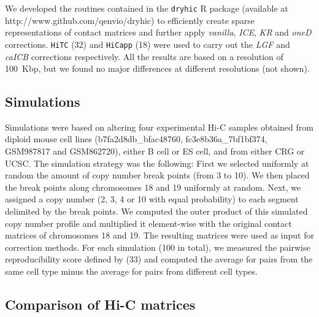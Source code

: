 \documentclass[a4,center,fleqn]{NAR}
\providecommand{\DIFadd}[1]{{\protect\color{red}#1}} %
\providecommand{\DIFdel}[1]{{\protect}}                      %
\providecommand{\DIFaddbegin}{} %
\providecommand{\DIFaddend}{} %
\providecommand{\DIFdelbegin}{} %
\providecommand{\DIFdelend}{} %
\begin{document}
We developed the routines contained in the \texttt{dryhic} R package
(available at http://www.github.com/qenvio/dryhic) to efficiently create
sparse representations of contact matrices and further apply
\textit{vanilla}, \textit{ICE}\DIFaddbegin \DIFadd{, }\textit{\DIFadd{KR}} \DIFaddend and \textit{oneD} corrections.
\texttt{HiTC} (\DIFdelbegin \DIFdel{33}\DIFdelend \DIFaddbegin \DIFadd{32}\DIFaddend ) and \texttt{HiCapp}
(18) were used to carry out the \textit{LGF} and
\textit{caICB} corrections respectively. All the results are based on a
resolution of 100\DIFdelbegin \DIFdel{kbp}\DIFdelend \DIFaddbegin \DIFadd{~Kbp}\DIFaddend , but we found no major differences at different
resolutions (not shown).

\DIFaddbegin \subsection{\DIFadd{Simulations}}


\DIFadd{Simulations were based on altering four experimental Hi-C samples obtained
from diploid mouse cell lines (b7fa2d8db\_bfac48760, fc3e8b36a\_7bf1bf374,
GSM987817 and GSM862720), either B cell or ES cell, and from either
CRG or UCSC. The simulation strategy was the following: First we selected
uniformly at random the amount of copy number break points (from 3 to 10).
We then placed the break points along chromosomes 18 and 19 uniformly at
random. Next, we assigned a copy number (2, 3, 4 or 10 with equal
probability) to each segment delimited by the break points. We computed
the outer product of this simulated copy number profile and multiplied it
element-wise with the original contact matrices of chromosomes 18 and 19.
The resulting matrices were used as input for correction methods. For each
simulation (100 in total), we measured the pairwise reproducibility score
defined by (33) and computed the average for pairs
from the same cell type minus the average for pairs from different cell
types.
}

\DIFaddend \subsection{Comparison of Hi-C matrices}
\DIFdelbegin %
\DIFdelend 
\end{document}
